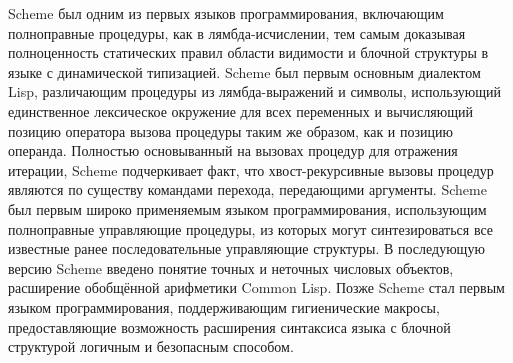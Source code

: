 Scheme был одним из первых языков программирования, включающим полноправные процедуры, как в
лямбда-исчислении, тем самым доказывая полноценность статических правил области видимости и
блочной структуры в языке с динамической типизацией. Scheme был первым основным диалектом Lisp,
различающим процедуры из лямбда-выражений и символы, использующий единственное лексическое
окружение для всех переменных и вычисляющий позицию оператора вызова процедуры таким же образом,
как и позицию операнда. Полностью основыванный на вызовах процедур для отражения итерации,
Scheme подчеркивает факт, что хвост-рекурсивные вызовы процедур являются по существу командами
перехода, передающими аргументы. Scheme был первым широко применяемым языком программирования,
использующим полноправные управляющие процедуры, из которых могут синтезироваться все известные
ранее последовательные управляющие структуры. В последующую версию Scheme введено понятие точных
и неточных числовых объектов, расширение обобщённой арифметики Common Lisp. Позже Scheme стал
первым языком программирования, поддерживающим гигиенические макросы, предоставляющие
возможность расширения синтаксиса языка с блочной структурой логичным и безопасным способом.\vspace{-3mm}

